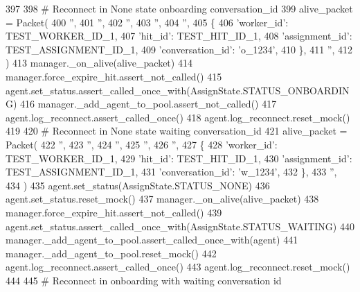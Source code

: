 \begin{DoxyCode}
397 
398         \textcolor{comment}{# Reconnect in None state onboarding conversation\_id}
399         alive\_packet = Packet(
400             \textcolor{stringliteral}{''},
401             \textcolor{stringliteral}{''},
402             \textcolor{stringliteral}{''},
403             \textcolor{stringliteral}{''},
404             \textcolor{stringliteral}{''},
405             \{
406                 \textcolor{stringliteral}{'worker\_id'}: TEST\_WORKER\_ID\_1,
407                 \textcolor{stringliteral}{'hit\_id'}: TEST\_HIT\_ID\_1,
408                 \textcolor{stringliteral}{'assignment\_id'}: TEST\_ASSIGNMENT\_ID\_1,
409                 \textcolor{stringliteral}{'conversation\_id'}: \textcolor{stringliteral}{'o\_1234'},
410             \},
411             \textcolor{stringliteral}{''},
412         )
413         manager.\_on\_alive(alive\_packet)
414         manager.force\_expire\_hit.assert\_not\_called()
415         agent.set\_status.assert\_called\_once\_with(AssignState.STATUS\_ONBOARDING)
416         manager.\_add\_agent\_to\_pool.assert\_not\_called()
417         agent.log\_reconnect.assert\_called\_once()
418         agent.log\_reconnect.reset\_mock()
419 
420         \textcolor{comment}{# Reconnect in None state waiting conversation\_id}
421         alive\_packet = Packet(
422             \textcolor{stringliteral}{''},
423             \textcolor{stringliteral}{''},
424             \textcolor{stringliteral}{''},
425             \textcolor{stringliteral}{''},
426             \textcolor{stringliteral}{''},
427             \{
428                 \textcolor{stringliteral}{'worker\_id'}: TEST\_WORKER\_ID\_1,
429                 \textcolor{stringliteral}{'hit\_id'}: TEST\_HIT\_ID\_1,
430                 \textcolor{stringliteral}{'assignment\_id'}: TEST\_ASSIGNMENT\_ID\_1,
431                 \textcolor{stringliteral}{'conversation\_id'}: \textcolor{stringliteral}{'w\_1234'},
432             \},
433             \textcolor{stringliteral}{''},
434         )
435         agent.set\_status(AssignState.STATUS\_NONE)
436         agent.set\_status.reset\_mock()
437         manager.\_on\_alive(alive\_packet)
438         manager.force\_expire\_hit.assert\_not\_called()
439         agent.set\_status.assert\_called\_once\_with(AssignState.STATUS\_WAITING)
440         manager.\_add\_agent\_to\_pool.assert\_called\_once\_with(agent)
441         manager.\_add\_agent\_to\_pool.reset\_mock()
442         agent.log\_reconnect.assert\_called\_once()
443         agent.log\_reconnect.reset\_mock()
444 
445         \textcolor{comment}{# Reconnect in onboarding with waiting conversation id}

\end{DoxyCode}
